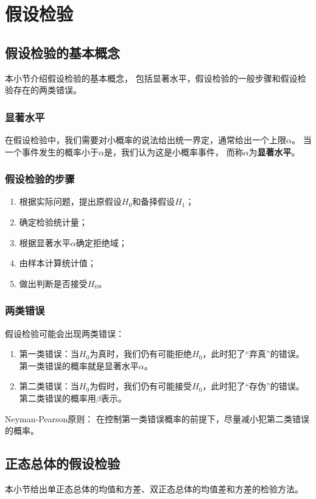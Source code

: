 \chapter{假设检验}

\section{假设检验的基本概念}
本小节介绍假设检验的基本概念，
包括显著水平，假设检验的一般步骤和假设检验存在的两类错误。

\subsection{显著水平}
在假设检验中，我们需要对小概率的说法给出统一界定，通常给出一个上限$\alpha$。
当一个事件发生的概率小于$\alpha$是，我们认为这是小概率事件，
而称$\alpha$为\textbf{显著水平}。

\subsection{假设检验的步骤}
\begin{enumerate}
  \item
  根据实际问题，提出原假设$H_0$和备择假设$H_1$；
  \item
  确定检验统计量；
  \item
  根据显著水平$\alpha$确定拒绝域；
  \item
  由样本计算统计值；
  \item
  做出判断是否接受$H_0$。
\end{enumerate}

\subsection{两类错误}
假设检验可能会出现两类错误：
\begin{enumerate}
  \item
  第一类错误：当$H_0$为真时，我们仍有可能拒绝$H_0$，此时犯了``弃真''的错误。
  第一类错误的概率就是显著水平$\alpha$。
  \item
  第二类错误：当$H_0$为假时，我们仍有可能接受$H_0$，此时犯了``存伪''的错误。
  第二类错误的概率用$\beta$表示。
\end{enumerate}

Neyman-Pearson原则：
在控制第一类错误概率的前提下，尽量减小犯第二类错误的概率。

\section{正态总体的假设检验}
本小节给出单正态总体的均值和方差、双正态总体的均值差和方差的检验方法。

